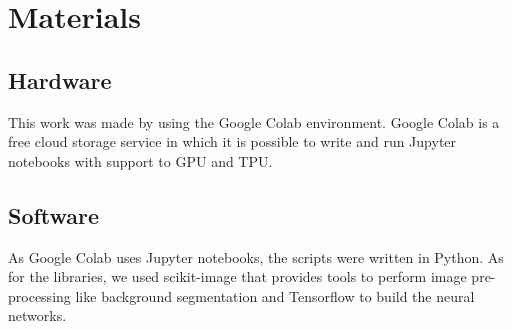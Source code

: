 \documentclass[../main.tex]{subfile}
\begin{document}
\section{Materials} \label{sec:materials}

\subsection{Hardware} \label{subsec:hardware}
This work was made by using the Google Colab environment. Google Colab is a free cloud storage service in which it is possible to write and run Jupyter notebooks with support to GPU and TPU.

\subsection{Software} \label{subsec:software}
As Google Colab uses Jupyter notebooks, the scripts were written in Python. As for the libraries, we used scikit-image that provides tools to perform image pre-processing like background segmentation and Tensorflow to build the neural networks.
\end{document}
